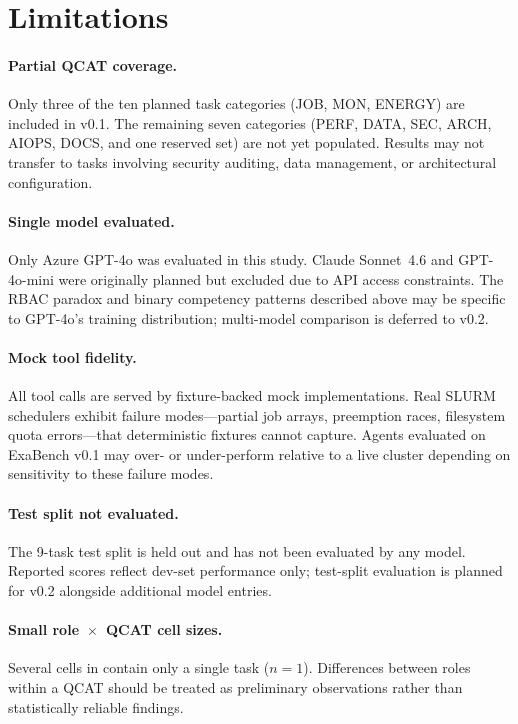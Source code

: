 \documentclass[12pt]{article}
\begin{document}
\section{Limitations}
\label{sec:limitations}

\paragraph{Partial QCAT coverage.}
Only three of the ten planned task categories (JOB, MON, ENERGY) are included
in v0.1. The remaining seven categories (PERF, DATA, SEC, ARCH, AIOPS, DOCS,
and one reserved set) are not yet populated. Results may not transfer to
tasks involving security auditing, data management, or architectural
configuration.

\paragraph{Single model evaluated.}
Only Azure GPT-4o was evaluated in this study. Claude Sonnet~4.6 and
GPT-4o-mini were originally planned but excluded due to API access
constraints. The RBAC paradox and binary competency patterns described above
may be specific to GPT-4o's training distribution; multi-model comparison is
deferred to v0.2.

\paragraph{Mock tool fidelity.}
All tool calls are served by fixture-backed mock implementations. Real SLURM
schedulers exhibit failure modes---partial job arrays, preemption races,
filesystem quota errors---that deterministic fixtures cannot capture. Agents
evaluated on ExaBench v0.1 may over- or under-perform relative to a live
cluster depending on sensitivity to these failure modes.

\paragraph{Test split not evaluated.}
The 9-task test split is held out and has not been evaluated by any model.
Reported scores reflect dev-set performance only; test-split evaluation is
planned for v0.2 alongside additional model entries.

\paragraph{Small role~$\times$~QCAT cell sizes.}
Several cells in  contain only a single task ($n=1$).
Differences between roles within a QCAT should be treated as preliminary
observations rather than statistically reliable findings.
\end{document}
